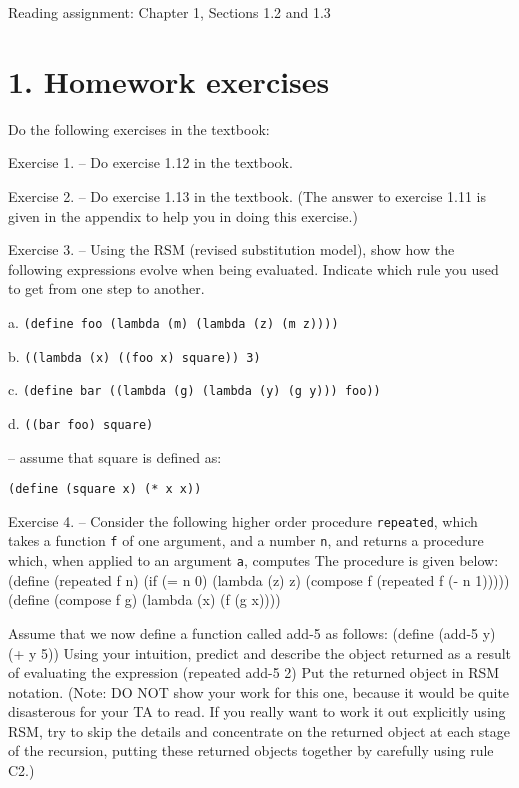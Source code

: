 \vpar
Reading assignment: Chapter 1, Sections 1.2 and 1.3

\chapter{1. Homework exercises}

Do the following exercises in the textbook:


\beginbullets

\bpar Exercise 1. -- Do exercise 1.12  in the textbook.


\bpar Exercise 2. -- Do exercise 1.13  in the textbook.
      (The answer to exercise 1.11 is given in the appendix to help you
      in doing this exercise.)

\bpar Exercise 3. -- Using the RSM (revised substitution model), show
      how the following expressions evolve when being evaluated.
      Indicate which rule you used to get from one step to another.

\hskip 20pt a. {\tt (define foo (lambda (m) (lambda (z) (m z))))}

\hskip 20pt b. {\tt  ((lambda (x) ((foo x) square)) 3)}

\hskip 20pt c. {\tt (define bar ((lambda (g) (lambda (y) (g y))) foo))}

\hskip 20pt d. {\tt ((bar foo) square)}

\hskip 20pt
-- assume that square is defined as:

\hskip 20pt      {\tt (define (square x) (* x x))}


\bpar Exercise 4. -- Consider the following higher order procedure
      {\tt repeated}, which takes a function {\tt f} of one argument, and
      a number {\tt n}, and returns a procedure which, when applied to an argument
      {\tt a}, computes 
      The procedure is given below:
\beginlisp
      (define (repeated f n)
        (if (= n 0)
            (lambda (z) z)
            (compose f (repeated f (- n 1)))))
\pbrk
      (define (compose f g)
        (lambda (x) (f (g x))))
\endlisp

\hskip 20pt
      Assume that we now define a function called add-5 as follows:
\beginlisp
      (define (add-5 y) (+ y 5))
\endlisp
      Using your intuition, predict and describe the object returned
      as a result of evaluating the expression
\beginlisp
      (repeated add-5 2)
\endlisp
      Put the returned object in RSM notation.  (Note: DO NOT show your
      work for this one, because it would be quite disasterous for
      your TA to read.  If you really want to work it out explicitly
      using RSM, try to skip the details and concentrate on the
      returned object at each stage of the recursion, putting
      these returned objects together by carefully using rule C2.)

